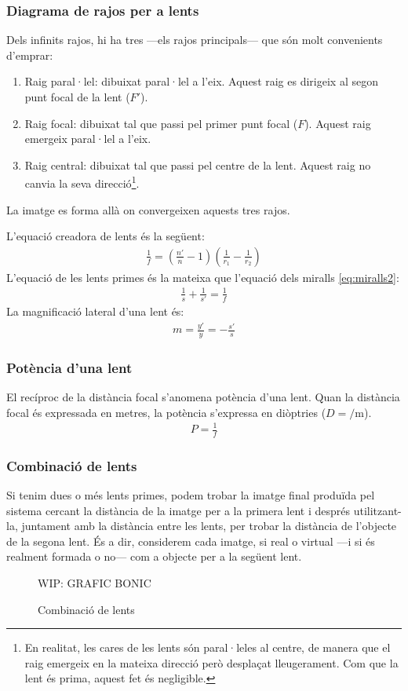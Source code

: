 \subsubsection*{Diagrama de rajos per a lents}
Dels infinits rajos, hi ha tres ---els rajos principals--- que són molt convenients d'emprar:
\begin{enumerate}
    \item Raig paral·lel: dibuixat paral·lel a l'eix. Aquest raig es dirigeix al segon punt focal de la lent ($F'$).
    \item Raig focal: dibuixat tal que passi pel primer punt focal ($F$). Aquest raig emergeix paral·lel a l'eix.
    \item Raig central: dibuixat tal que passi pel centre de la lent. Aquest raig no canvia la seva direcció\footnote{En realitat, les cares de les lents són paral·leles al centre, de manera que el raig emergeix en la mateixa direcció però desplaçat lleugerament. Com que la lent és prima, aquest fet és negligible.}.
\end{enumerate}
La imatge es forma allà on convergeixen aquests tres rajos.

L'equació creadora de lents és la següent:
\begin{align}
    \boxed{\frac{1}{f} = \left( \frac{n'}{n} - 1 \right) \left( \frac{1}{r_{1}} - \frac{1}{r_{2}} \right)}
\end{align}
L'equació de les lents primes és la mateixa que l'equació dels miralls \eqref{eq:miralls2}:
\begin{align}
    \boxed{\frac{1}{s} + \frac{1}{s'} = \frac{1}{f}}
\end{align}
La magnificació lateral d'una lent és:
\begin{align}
    \boxed{m = \frac{y'}{y} = - \frac{s'}{s}}
\end{align}

\subsubsection*{Potència d'una lent}
El recíproc de la distància focal s'anomena potència d'una lent. Quan la distància focal és expressada en metres, la potència s'expressa en diòptries ($D = \si{\per\m}$).
\begin{align}
    \boxed{P = \frac{1}{f}}
\end{align}

\subsubsection*{Combinació de lents}
Si tenim dues o més lents primes, podem trobar la imatge final produïda pel sistema cercant la distància de la imatge per a la primera lent i després utilitzant-la, juntament amb la distància entre les lents, per trobar la distància de l'objecte de la segona lent. És a dir, considerem cada imatge, si real o virtual ---i si és realment formada o no--- com a objecte per a la següent lent.
\begin{figure}
\centering
    WIP: GRAFIC BONIC 
\caption{Combinació de lents}
\end{figure}


